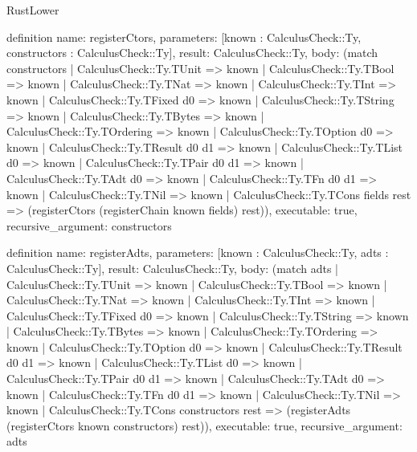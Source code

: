 \begin{lexlean}{RustLower}
\begin{semanticmodule}
definition{
  name: registerCtors,
  parameters: [known : CalculusCheck::Ty, constructors : CalculusCheck::Ty],
  result: CalculusCheck::Ty,
  body: (match constructors
    | CalculusCheck::Ty.TUnit => known
    | CalculusCheck::Ty.TBool => known
    | CalculusCheck::Ty.TNat => known
    | CalculusCheck::Ty.TInt => known
    | CalculusCheck::Ty.TFixed d0 => known
    | CalculusCheck::Ty.TString => known
    | CalculusCheck::Ty.TBytes => known
    | CalculusCheck::Ty.TOrdering => known
    | CalculusCheck::Ty.TOption d0 => known
    | CalculusCheck::Ty.TResult d0 d1 => known
    | CalculusCheck::Ty.TList d0 => known
    | CalculusCheck::Ty.TPair d0 d1 => known
    | CalculusCheck::Ty.TAdt d0 => known
    | CalculusCheck::Ty.TFn d0 d1 => known
    | CalculusCheck::Ty.TNil => known
    | CalculusCheck::Ty.TCons fields rest => (registerCtors (registerChain known fields) rest)),
  executable: true,
  recursive_argument: constructors
}

definition{
  name: registerAdts,
  parameters: [known : CalculusCheck::Ty, adts : CalculusCheck::Ty],
  result: CalculusCheck::Ty,
  body: (match adts
    | CalculusCheck::Ty.TUnit => known
    | CalculusCheck::Ty.TBool => known
    | CalculusCheck::Ty.TNat => known
    | CalculusCheck::Ty.TInt => known
    | CalculusCheck::Ty.TFixed d0 => known
    | CalculusCheck::Ty.TString => known
    | CalculusCheck::Ty.TBytes => known
    | CalculusCheck::Ty.TOrdering => known
    | CalculusCheck::Ty.TOption d0 => known
    | CalculusCheck::Ty.TResult d0 d1 => known
    | CalculusCheck::Ty.TList d0 => known
    | CalculusCheck::Ty.TPair d0 d1 => known
    | CalculusCheck::Ty.TAdt d0 => known
    | CalculusCheck::Ty.TFn d0 d1 => known
    | CalculusCheck::Ty.TNil => known
    | CalculusCheck::Ty.TCons constructors rest => (registerAdts (registerCtors known constructors) rest)),
  executable: true,
  recursive_argument: adts
}


\end{semanticmodule}
\end{lexlean}
